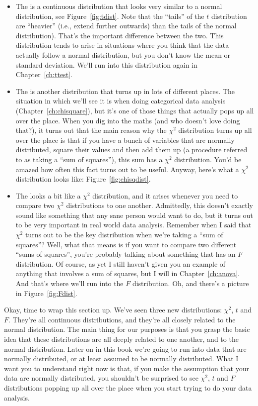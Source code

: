 \newpage
\begin{itemize}
\item  The  is a continuous distribution that looks very similar to a normal distribution, see Figure~\ref{fig:tdist}. Note that the ``tails'' of the $t$ distribution are ``heavier'' (i.e., extend further outwards) than the tails of the normal distribution). That's the important difference between the two. This distribution tends to arise in situations where you think that the data actually follow a normal distribution, but you don't know the mean or standard deviation. We'll run into this distribution again in Chapter~\ref{ch:ttest}. 

\item The  is another distribution that turns up in lots of different places. The situation in which we'll see it is when doing categorical data analysis (Chapter~\ref{ch:chisquare}), but it's one of those things that actually pops up all over the place. When you dig into the maths (and who doesn't love doing that?), it turns out that the main reason why the $\chi^2$ distribution turns up all over the place is that if you have a bunch of variables that are normally distributed, square their values and then add them up (a procedure referred to as taking a ``sum of squares''), this sum has a $\chi^2$ distribution. You'd be amazed how often this fact turns out to be useful. Anyway, here's what a $\chi^2$ distribution looks like: Figure~\ref{fig:chisqdist}.  

\item The  looks a bit like a $\chi^2$ distribution, and it arises whenever you need to compare two $\chi^2$ distributions to one another. Admittedly, this doesn't exactly sound like something that any sane person would want to do, but it turns out to be very important in real world data analysis. Remember when I said that $\chi^2$ turns out to be the key distribution when we're taking a ``sum of squares''? Well, what that means is if you want to compare two different ``sums of squares'', you're probably talking about something that has an $F$ distribution. Of course, as yet I still haven't given you an example of anything that involves a sum of squares, but I will in Chapter~\ref{ch:anova}. And that's where we'll run into the $F$ distribution. Oh, and there's a picture in Figure~\ref{fig:Fdist}. 
\end{itemize}

Okay, time to wrap this section up. We've seen three new distributions: $\chi^2$, $t$ and $F$. They're all continuous distributions, and they're all closely related to the normal distribution. The main thing for our purposes is that you grasp the basic idea that these distributions are all deeply related to one another, and to the normal distribution. Later on in this book we're going to run into data that are normally distributed, or at least assumed to be normally distributed. What I want you to understand right now is that, if you make the assumption that your data are normally distributed, you shouldn't be surprised to see $\chi^2$, $t$ and $F$ distributions popping up all over the place when you start trying to do your data analysis. 


